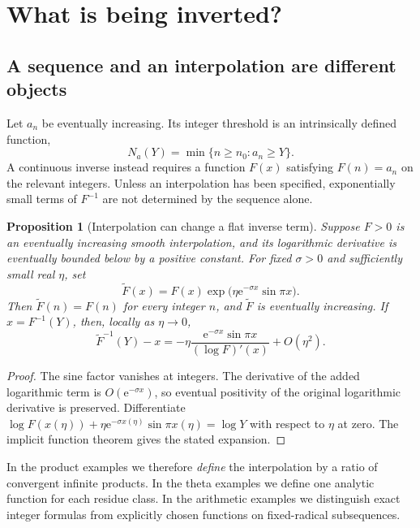 \documentclass[11pt]{article}
\numberwithin{equation}{section}
\newtheorem{proposition}[theorem]{Proposition}
\theoremstyle{definition}
\newcommand{\ee}{\mathrm e}
\begin{document}
\section{What is being inverted?}
\label{sec:interpolation}

\subsection{A sequence and an interpolation are different objects}

Let $a_n$ be eventually increasing. Its integer threshold is an intrinsically defined function,
\begin{equation}\label{eq:threshold}
 N_a(Y)=\min\{n\ge n_0:a_n\ge Y\}.
\end{equation}
A continuous inverse instead requires a function $F(x)$ satisfying $F(n)=a_n$ on the relevant integers. Unless an interpolation has been specified, exponentially small terms of $F^{-1}$ are not determined by the sequence alone.

\begin{proposition}[Interpolation can change a flat inverse term]\label{prop:ambiguity}
Suppose $F>0$ is an eventually increasing smooth interpolation, and its logarithmic derivative is eventually bounded below by a positive constant. For fixed $\sigma>0$ and sufficiently small real $\eta$, set
\[
 \widetilde F(x)=F(x)\exp\!\bigl(\eta\ee^{-\sigma x}\sin\pi x\bigr).
\]
Then $\widetilde F(n)=F(n)$ for every integer $n$, and $\widetilde F$ is eventually increasing. If $x=F^{-1}(Y)$, then, locally as $\eta\to0$,
\begin{equation}\label{eq:interpolation-shift}
 \widetilde F^{-1}(Y)-x
 =-\eta\frac{\ee^{-\sigma x}\sin\pi x}{(\log F)'(x)}+O(\eta^2).
\end{equation}
\end{proposition}
\begin{proof}
The sine factor vanishes at integers. The derivative of the added logarithmic term is $O(\ee^{-\sigma x})$, so eventual positivity of the original logarithmic derivative is preserved. Differentiate
$\log F(x(\eta))+\eta\ee^{-\sigma x(\eta)}\sin\pi x(\eta)=\log Y$
with respect to $\eta$ at zero. The implicit function theorem gives the stated expansion.
\end{proof}

In the product examples we therefore \emph{define} the interpolation by a ratio of convergent infinite products. In the theta examples we define one analytic function for each residue class. In the arithmetic examples we distinguish exact integer formulas from explicitly chosen functions on fixed-radical subsequences.
\end{document}
